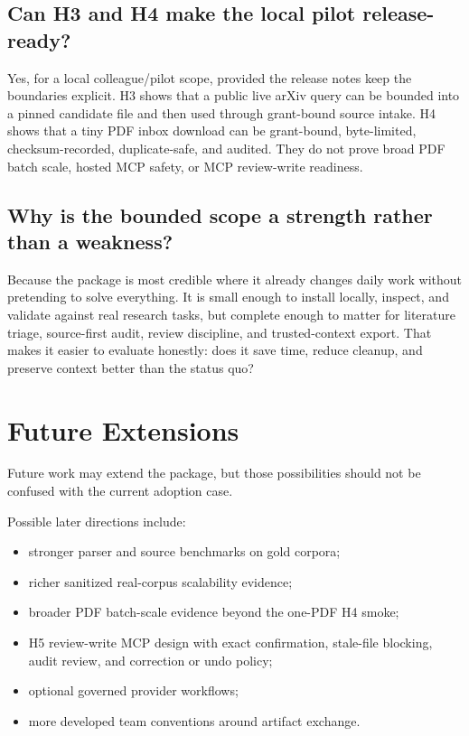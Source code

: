 \documentclass[11pt,a4paper,openany]{book}
\begin{document}
\section{Can H3 and H4 make the local pilot release-ready?}

Yes, for a local colleague/pilot scope, provided the release notes keep the
boundaries explicit. H3 shows that a public live arXiv query can be bounded into
a pinned candidate file and then used through grant-bound source intake. H4 shows
that a tiny PDF inbox download can be grant-bound, byte-limited,
checksum-recorded, duplicate-safe, and audited. They do not prove broad PDF batch
scale, hosted MCP safety, or MCP review-write readiness.

\section{Why is the bounded scope a strength rather than a weakness?}

Because the package is most credible where it already changes daily work without
pretending to solve everything. It is small enough to install locally, inspect,
and validate against real research tasks, but complete enough to matter for
literature triage, source-first audit, review discipline, and trusted-context
export. That makes it easier to evaluate honestly: does it save time, reduce
cleanup, and preserve context better than the status quo?

\chapter{Future Extensions}

Future work may extend the package, but those possibilities should not be
confused with the current adoption case.

Possible later directions include:
\begin{itemize}[nosep]
  \item stronger parser and source benchmarks on gold corpora;
  \item richer sanitized real-corpus scalability evidence;
  \item broader PDF batch-scale evidence beyond the one-PDF H4 smoke;
  \item H5 review-write MCP design with exact confirmation, stale-file blocking,
        audit review, and correction or undo policy;
  \item optional governed provider workflows;
  \item more developed team conventions around artifact exchange.
\end{itemize}
\end{document}
